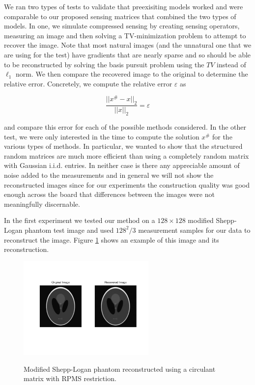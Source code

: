 We ran two types of tests to validate that preexisiting models worked and were
comparable to our proposed sensing matrices that combined the two types of
models. In one, we simulate compressed sensing by creating sensing operators,
measuring an image and then solving a TV-minimization problem to attempt to
recover the image. Note that most natural images (and the unnatural one that we
are using for the test) have gradients that are nearly sparse and so should be
able to be reconstructed by solving the basis pursuit problem using the $TV$
instead of $\ell_1$ norm.  We then compare the recovered image to the original
to determine the relative error. Concretely, we compute the relative error
$\varepsilon$ as

\begin{equation}
  \frac{||x^{\#} - x||_2}{||x||_2} = \varepsilon
\end{equation}

and compare this error for each of the possible methods considered. In the other
test, we were only interested in the time to compute the solution $x^{\#}$ for
the various types of methods. In particular, we wanted to show that the
structured random matrices are much more efficient than using a completely
random matrix with Gaussian i.i.d. entries. In neither case is there any
appreciable amount of noise added to the measurements and in general we will
not show the reconstructed images since for our experiments the construction
quality was good enough across the board that differences between the images
were not meaningfully discernable. 

In the first experiment we tested our method on a $128 \times 128$ modified
Shepp-Logan phantom test image and used $128^2/3$ measurement samples for our
data to reconstruct the image. Figure \ref{fig:shepplogan} shows an example of
this image and its reconstruction.


\begin{figure}[h!]
  \centering
  \caption{Modified Shepp-Logan phantom reconstructed using a circulant matrix with RPMS restriction.}
  \includegraphics[width=0.6\textwidth, trim= 0 40 0 40, clip=true]{figs/rpms.pdf}
  \label{fig:shepplogan}
\end{figure}


